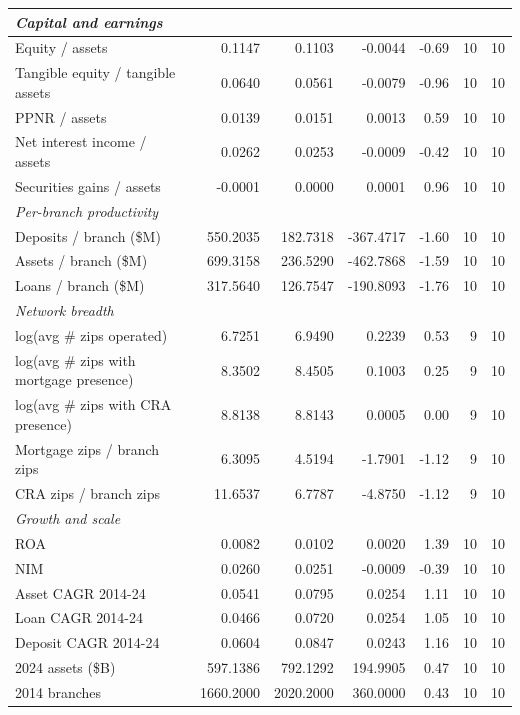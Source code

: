 \begin{tabular}{lrrrrrr}
\midrule
\multicolumn{7}{l}{\emph{Capital and earnings}} \\
\midrule
Equity / assets & 0.1147 & 0.1103 & -0.0044 & -0.69 & 10 & 10 \\
Tangible equity / tangible assets & 0.0640 & 0.0561 & -0.0079 & -0.96 & 10 & 10 \\
PPNR / assets & 0.0139 & 0.0151 & 0.0013 & 0.59 & 10 & 10 \\
Net interest income / assets & 0.0262 & 0.0253 & -0.0009 & -0.42 & 10 & 10 \\
Securities gains / assets & -0.0001 & 0.0000 & 0.0001 & 0.96 & 10 & 10 \\
\midrule
\multicolumn{7}{l}{\emph{Per-branch productivity}} \\
\midrule
Deposits / branch (\$M) & 550.2035 & 182.7318 & -367.4717 & -1.60 & 10 & 10 \\
Assets / branch (\$M) & 699.3158 & 236.5290 & -462.7868 & -1.59 & 10 & 10 \\
Loans / branch (\$M) & 317.5640 & 126.7547 & -190.8093 & -1.76 & 10 & 10 \\
\midrule
\multicolumn{7}{l}{\emph{Network breadth}} \\
\midrule
log(avg \# zips operated) & 6.7251 & 6.9490 & 0.2239 & 0.53 & 9 & 10 \\
log(avg \# zips with mortgage presence) & 8.3502 & 8.4505 & 0.1003 & 0.25 & 9 & 10 \\
log(avg \# zips with CRA presence) & 8.8138 & 8.8143 & 0.0005 & 0.00 & 9 & 10 \\
Mortgage zips / branch zips & 6.3095 & 4.5194 & -1.7901 & -1.12 & 9 & 10 \\
CRA zips / branch zips & 11.6537 & 6.7787 & -4.8750 & -1.12 & 9 & 10 \\
\midrule
\multicolumn{7}{l}{\emph{Growth and scale}} \\
\midrule
ROA & 0.0082 & 0.0102 & 0.0020 & 1.39 & 10 & 10 \\
NIM & 0.0260 & 0.0251 & -0.0009 & -0.39 & 10 & 10 \\
Asset CAGR 2014-24 & 0.0541 & 0.0795 & 0.0254 & 1.11 & 10 & 10 \\
Loan CAGR 2014-24 & 0.0466 & 0.0720 & 0.0254 & 1.05 & 10 & 10 \\
Deposit CAGR 2014-24 & 0.0604 & 0.0847 & 0.0243 & 1.16 & 10 & 10 \\
2024 assets (\$B) & 597.1386 & 792.1292 & 194.9905 & 0.47 & 10 & 10 \\
2014 branches & 1660.2000 & 2020.2000 & 360.0000 & 0.43 & 10 & 10 \\

\end{tabular}

